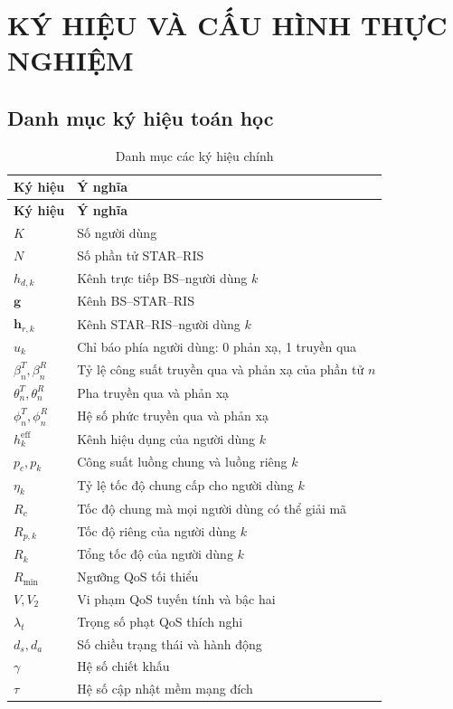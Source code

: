\chapter{KÝ HIỆU VÀ CẤU HÌNH THỰC NGHIỆM}
\label{app:config}

\section{Danh mục ký hiệu toán học}
\begin{longtable}{p{3.0cm}p{11.0cm}}
\caption{Danh mục các ký hiệu chính}\label{tab:symbols}\\
\toprule
\textbf{Ký hiệu} & \textbf{Ý nghĩa}\\
\midrule
\endfirsthead
\toprule
\textbf{Ký hiệu} & \textbf{Ý nghĩa}\\
\midrule
\endhead
$K$ & Số người dùng\\
$N$ & Số phần tử STAR--RIS\\
$h_{d,k}$ & Kênh trực tiếp BS--người dùng $k$\\
$\bm g$ & Kênh BS--STAR--RIS\\
$\bm h_{r,k}$ & Kênh STAR--RIS--người dùng $k$\\
$u_k$ & Chỉ báo phía người dùng: 0 phản xạ, 1 truyền qua\\
$\beta_n^T,\beta_n^R$ & Tỷ lệ công suất truyền qua và phản xạ của phần tử $n$\\
$\theta_n^T,\theta_n^R$ & Pha truyền qua và phản xạ\\
$\phi_n^T,\phi_n^R$ & Hệ số phức truyền qua và phản xạ\\
$h_k^{\mathrm{eff}}$ & Kênh hiệu dụng của người dùng $k$\\
$p_c,p_k$ & Công suất luồng chung và luồng riêng $k$\\
$\eta_k$ & Tỷ lệ tốc độ chung cấp cho người dùng $k$\\
$R_c$ & Tốc độ chung mà mọi người dùng có thể giải mã\\
$R_{p,k}$ & Tốc độ riêng của người dùng $k$\\
$R_k$ & Tổng tốc độ của người dùng $k$\\
$R_{\min}$ & Ngưỡng QoS tối thiểu\\
$V,V_2$ & Vi phạm QoS tuyến tính và bậc hai\\
$\lambda_t$ & Trọng số phạt QoS thích nghi\\
$d_s,d_a$ & Số chiều trạng thái và hành động\\
$\gamma$ & Hệ số chiết khấu\\
$\tau$ & Hệ số cập nhật mềm mạng đích\\
\bottomrule
\end{longtable}

